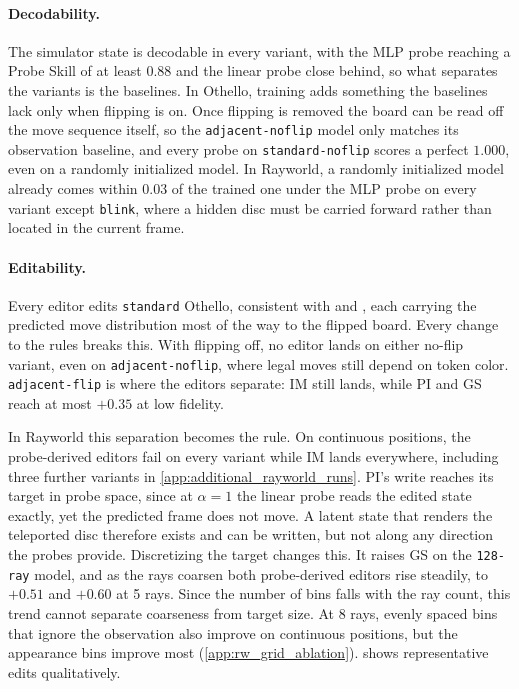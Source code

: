 \documentclass{article} %
\begin{document}
\paragraph{Decodability.}
The simulator state is decodable in every variant, with the MLP probe reaching a Probe Skill of at least $0.88$ and the linear probe close behind, so what separates the variants is the baselines. In Othello, training adds something the baselines lack only when flipping is on. Once flipping is removed the board can be read off the move sequence itself, so the \texttt{adjacent-noflip} model only matches its observation baseline, and every probe on \texttt{standard-noflip} scores a perfect $1.000$, even on a randomly initialized model. In Rayworld, a randomly initialized model already comes within $0.03$ of the trained one under the MLP probe on every variant except \texttt{blink}, where a hidden disc must be carried forward rather than located in the current frame.

\paragraph{Editability.}
Every editor edits \texttt{standard} Othello, consistent with \citet{li2023othello} and \citet{nanda2023linear}, each carrying the predicted move distribution most of the way to the flipped board. Every change to the rules breaks this. With flipping off, no editor lands on either no-flip variant, even on \texttt{adjacent-noflip}, where legal moves still depend on token color. \texttt{adjacent-flip} is where the editors separate: IM still lands, while PI and GS reach at most $+0.35$ at low fidelity. 

In Rayworld this separation becomes the rule. On continuous positions, the probe-derived editors fail on every variant while IM lands everywhere, including three further variants in \cref{app:additional_rayworld_runs}. PI's write reaches its target in probe space, since at $\alpha = 1$ the linear probe reads the edited state exactly, yet the predicted frame does not move. A latent state that renders the teleported disc therefore exists and can be written, but not along any direction the probes provide. Discretizing the target changes this. It raises GS on the \texttt{128-ray} model, and as the rays coarsen both probe-derived editors rise steadily, to $+0.51$ and $+0.60$ at 5 rays. Since the number of bins falls with the ray count, this trend cannot separate coarseness from target size. At 8 rays, evenly spaced bins that ignore the observation also improve on continuous positions, but the appearance bins improve most (\cref{app:rw_grid_ablation}).  shows representative edits qualitatively.
\end{document}
